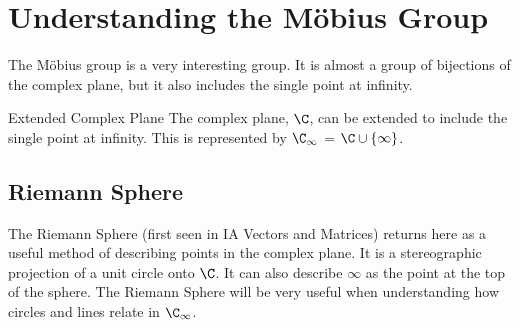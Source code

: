 \documentclass[../Main.tex]{subfiles}
\begin{document}
\section{Understanding the \texorpdfstring{M\"obius}{Mobius} Group}
The M\"obius group is a very interesting group. It is almost a group of bijections of the complex plane, but it also includes the single point at infinity.
\begin{definition}{Extended Complex Plane}
    The complex plane, $\C$, can be extended to include the single point at infinity. This is represented by $\CInf$ = $\C \cup \{\infty\}$.
\end{definition}
\subsection{Riemann Sphere}
The Riemann Sphere (first seen in IA Vectors and Matrices) returns here as a useful method of describing points in the complex plane. It is a stereographic projection of a unit circle onto $\C$. It can also describe $\infty$ as the point at the top of the sphere. The Riemann Sphere will be very useful when understanding how circles and lines relate in $\CInf$.
\end{document}

